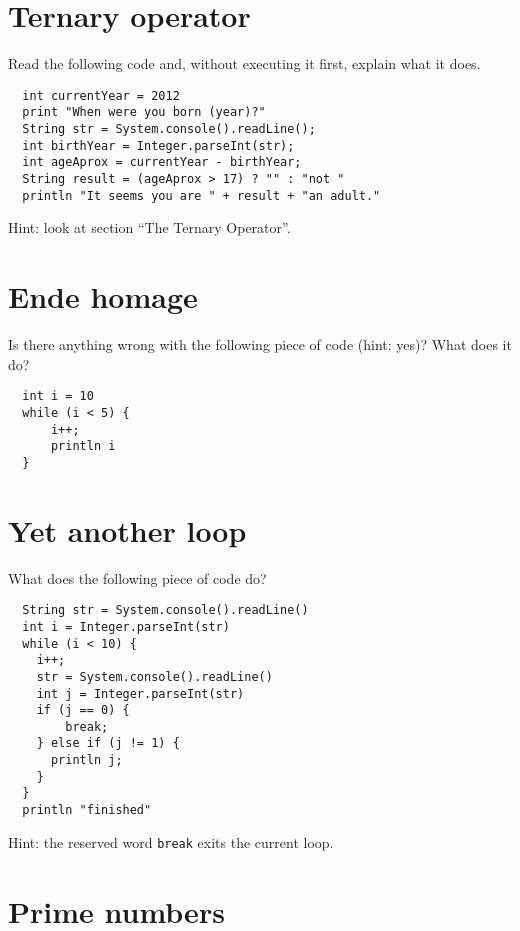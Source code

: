 \documentclass{article}
\begin{document}
\section{Ternary operator}
\label{sec:ternary-operator}

Read the following code and, without executing it first, explain what
it does. 

\begin{verbatim}
  int currentYear = 2012
  print "When were you born (year)?"
  String str = System.console().readLine();
  int birthYear = Integer.parseInt(str);
  int ageAprox = currentYear - birthYear;
  String result = (ageAprox > 17) ? "" : "not "
  println "It seems you are " + result + "an adult." 
\end{verbatim}

Hint: look at section ``The Ternary Operator''. 

\section{Ende homage}
\label{sec:ende-homage}

Is there anything wrong with the following piece of code (hint: yes)?
What does it do?  

\begin{verbatim}
  int i = 10
  while (i < 5) {
      i++;
      println i
  }
\end{verbatim}

\section{Yet another loop}
\label{sec:yet-another-loop}

What does the following piece of code do?

\begin{verbatim}
  String str = System.console().readLine()
  int i = Integer.parseInt(str)
  while (i < 10) {
    i++;
    str = System.console().readLine()
    int j = Integer.parseInt(str)
    if (j == 0) {
        break;
    } else if (j != 1) {
      println j;
    }
  }
  println "finished"
\end{verbatim}

Hint: the reserved word \verb+break+ exits the current loop. 

\section{Prime numbers}
\label{sec:prime-numbers}
\end{document}
